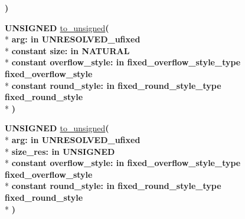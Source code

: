 \begin{DoxyCompactItemize}
{\bfseries  )} 
\item 
{\bfseries {\bfseries \textcolor{comment}{U\+N\+S\+I\+G\+N\+E\+D}\textcolor{vhdlchar}{ }}} \hyperlink{class__fixed__pkg_a56598bb3d7b796e9fcbcedafc6e8b887}{to\+\_\+unsigned}{\bfseries  ( }\\*
{\bfseries \textcolor{vhdlchar}{arg\+: }\textcolor{stringliteral}{in }\textcolor{vhdlchar}{U\+N\+R\+E\+S\+O\+L\+V\+E\+D\+\_\+ufixed}}\\*
{\bfseries {\bfseries \textcolor{keywordflow}{constant}\textcolor{vhdlchar}{ }}\textcolor{vhdlchar}{size\+: }\textcolor{stringliteral}{in }{\bfseries \textcolor{comment}{N\+A\+T\+U\+R\+A\+L}\textcolor{vhdlchar}{ }}}\\*
{\bfseries {\bfseries \textcolor{keywordflow}{constant}\textcolor{vhdlchar}{ }}\textcolor{vhdlchar}{overflow\+\_\+style\+: }\textcolor{stringliteral}{in }\textcolor{vhdlchar}{fixed\+\_\+overflow\+\_\+style\+\_\+type     fixed\+\_\+overflow\+\_\+style}}\\*
{\bfseries {\bfseries \textcolor{keywordflow}{constant}\textcolor{vhdlchar}{ }}\textcolor{vhdlchar}{round\+\_\+style\+: }\textcolor{stringliteral}{in }\textcolor{vhdlchar}{fixed\+\_\+round\+\_\+style\+\_\+type     fixed\+\_\+round\+\_\+style}}\\*
{\bfseries  )} 
\item 
{\bfseries {\bfseries \textcolor{comment}{U\+N\+S\+I\+G\+N\+E\+D}\textcolor{vhdlchar}{ }}} \hyperlink{class__fixed__pkg_aeb7963e65584583be9e6899d2b7887e6}{to\+\_\+unsigned}{\bfseries  ( }\\*
{\bfseries \textcolor{vhdlchar}{arg\+: }\textcolor{stringliteral}{in }\textcolor{vhdlchar}{U\+N\+R\+E\+S\+O\+L\+V\+E\+D\+\_\+ufixed}}\\*
{\bfseries \textcolor{vhdlchar}{size\+\_\+res\+: }\textcolor{stringliteral}{in }{\bfseries \textcolor{comment}{U\+N\+S\+I\+G\+N\+E\+D}\textcolor{vhdlchar}{ }}}\\*
{\bfseries {\bfseries \textcolor{keywordflow}{constant}\textcolor{vhdlchar}{ }}\textcolor{vhdlchar}{overflow\+\_\+style\+: }\textcolor{stringliteral}{in }\textcolor{vhdlchar}{fixed\+\_\+overflow\+\_\+style\+\_\+type     fixed\+\_\+overflow\+\_\+style}}\\*
{\bfseries {\bfseries \textcolor{keywordflow}{constant}\textcolor{vhdlchar}{ }}\textcolor{vhdlchar}{round\+\_\+style\+: }\textcolor{stringliteral}{in }\textcolor{vhdlchar}{fixed\+\_\+round\+\_\+style\+\_\+type     fixed\+\_\+round\+\_\+style}}\\*
{\bfseries  )} 
\item 

\end{DoxyCompactItemize}
